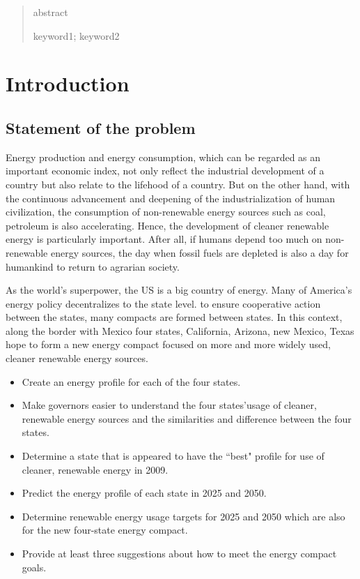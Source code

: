 \documentclass{mcmthesis}
\title{}
\newcommand{\rmnum}[1]{\romannumeral #1}
\begin{document}
\begin{abstract}
abstract
\begin{keywords}
keyword1; keyword2
\end{keywords}
\end{abstract}
\maketitle


\tableofcontents
\pagestyle{fancy} 
\rhead{\small\sffamily  \rmnum{\thepage}}
\newpage
\pagestyle{fancy}
\setcounter{page}{1}

\section{Introduction}
\subsection{Statement of the problem}
Energy production and energy consumption, which can be regarded as an important economic index, not only reflect the industrial development of a country but also relate to the lifehood of a country. But on the other hand, with the continuous advancement and deepening of the industrialization of human civilization, the consumption of non-renewable energy sources such as coal, petroleum is also accelerating. Hence, the development of cleaner renewable energy is particularly important. After all, if humans depend too much on non-renewable energy sources, the day when fossil fuels are depleted is also a day for humankind to return to agrarian society.

As the world's superpower, the US is a big country of energy. Many of America's energy policy decentralizes to the state level. to ensure cooperative action between the states\cite{InterstateCompact}, many compacts are formed between states. In this context, along the border with Mexico four states, California, Arizona, new Mexico, Texas hope to form a new energy compact focused on more and more widely used, cleaner renewable energy sources.
\begin{itemize}
  \item Create an energy profile for each of the four states.
  \item Make governors easier to understand the four states'usage of cleaner, renewable energy sources  and the similarities and difference between the four states.
  \item Determine a state that is appeared to have the ``best" profile for use of cleaner, renewable energy in 2009.
  \item Predict the energy profile of each state in 2025 and 2050.
  \item Determine renewable energy usage targets for 2025 and 2050 which are also for the new four-state energy compact.
  \item Provide at least three suggestions about how to meet the energy compact goals.
\end{itemize}
\end{document}
